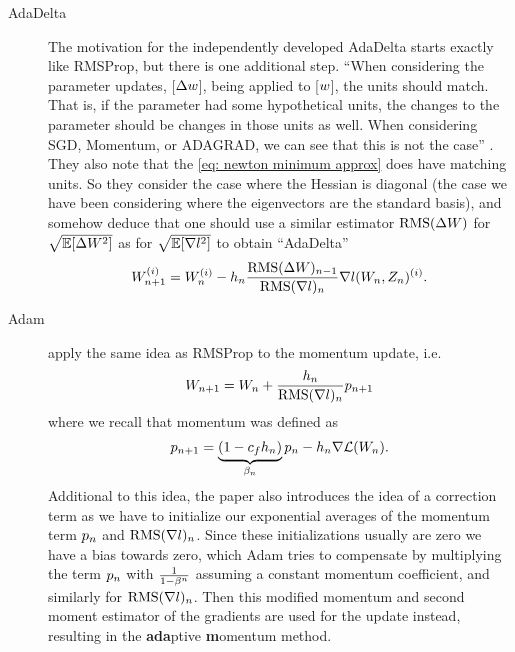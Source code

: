 \begin{description}
	\item[AdaDelta] \parencite{zeilerADADELTAAdaptiveLearning2012} The motivation
	for the independently developed AdaDelta starts exactly like RMSProp, but
	there is one additional step.
	``When considering the parameter updates, [\(\Delta w\)], being applied to
	[\(w\)], the units should match. That is, if the parameter had some
	hypothetical units, the changes to the parameter should be changes in those
	units as well. When considering SGD, Momentum, or ADAGRAD, we can see that
	this is not the case'' \parencite[p. 3]{zeilerADADELTAAdaptiveLearning2012}.
	They also note that the \ref{eq: newton minimum approx} does have matching
	units. So they consider the case where the Hessian is diagonal (the case we
	have been considering where the eigenvectors are the standard basis), and
	somehow deduce that one should use a similar estimator
	\(\text{RMS}(\Delta W)\) for \(\sqrt{\mathbb{E}[\Delta W^2]}\) as for
	\(\sqrt{\mathbb{E}[\nabla l^2]}\) to obtain ``AdaDelta''
	\begin{align*}
		W_{n+1}^{(i)} = W_n^{(i)}
		-h_n\frac{\text{RMS}(\Delta W)_{n-1}}{\text{RMS}(\nabla l)_n}
		\nabla l(W_n, Z_n)^{(i)}.
	\end{align*}

	\item[Adam] \textcite{kingmaAdamMethodStochastic2017} apply the same idea
	as RMSProp to the momentum update, i.e.
	\begin{align*}
		W_{n+1} = W_n + \frac{h_n}{\text{RMS}(\nabla l)_n} p_{n+1}
	\end{align*}
	where we recall that momentum was defined as
	\begin{align*}
		p_{n+1} = \underbrace{(1-c_f h_n)}_{\beta_n} p_n - h_n\nabla\mathcal{L}(W_n).
	\end{align*}
	Additional to this idea, the paper also introduces the idea of a correction term
	as we have to initialize our exponential averages of the momentum term \(p_n\)
	and \(\text{RMS}(\nabla l)_n\). Since these initializations usually are zero
	we have a bias towards zero, which Adam tries to compensate by multiplying
	the term \(p_n\) with \(\frac{1}{1-\beta^n}\) assuming a constant
	momentum coefficient, and similarly for \(\text{RMS}(\nabla l)_n\). Then
	this modified momentum and second moment estimator of the gradients are
	used for the update instead, resulting in the \textbf{ada}ptive \textbf{m}omentum method.


\end{description}
